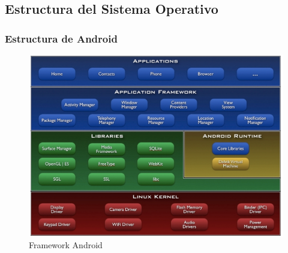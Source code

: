 \documentclass[xcolor={dvipsnames}]{beamer}
\begin{document}
\subsection{Estructura del Sistema Operativo}
\begin{frame}\frametitle{Estructura de Android}
    \begin{figure}
    \includegraphics[scale=0.28]{images/estructura_android} 
    \caption{Framework Android}
    \end{figure}
\end{frame}
\end{document}
